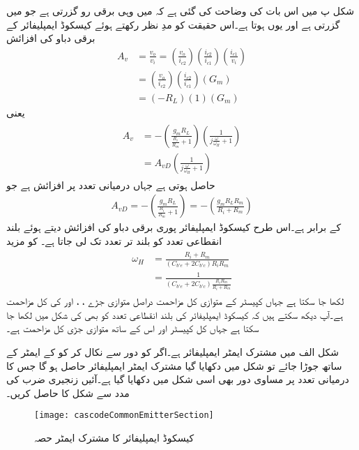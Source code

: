 شکل  پ میں اس بات کی وضاحت کی گئی ہے کہ  میں وہی برقی رو گزرتی ہے جو  میں گزرتی ہے اور یوں  ہوتا ہے۔اس حقیقت کو مدِ نظر رکھتے ہوئے کیسکوڈ ایمپلیفائر کے برقی دباو کی افزائش 
\begin{align*}
A_v&=\frac{v_o}{v_i}=\left( \frac{v_o}{i_{c2}} \right) \left(\frac{i_{c2}}{i_{c1}} \right) \left(\frac{i_{c1}}{v_i} \right)\\
&=\left( \frac{v_o}{i_{c2}} \right) \left(\frac{i_{c2}}{i_{c1}} \right) \left(G_m \right)\\
&=\left(-R_L \right) \left(1 \right) \left(G_m \right)
\end{align*}
یعنی
\begin{gather}
\begin{aligned}
A_v&=-\left(\frac{g_m R_L}{\frac{R_i}{R_m}+1} \right) \left(\frac{1}{j \frac{\omega}{\omega_H} +1}\right)\\
&=A_{vD} \left(\frac{1}{j \frac{\omega}{\omega_H} +1}\right)
\end{aligned}
\end{gather}
حاصل ہوتی ہے جہاں  درمیانی تعدد پر افزائش ہے جو
\begin{align}\label{مساوات_تعددی_ردعمل_کیسکوڈ_درمیانی_تعدد_کی_افزائش}
A_{vD}=-\left(\frac{g_m R_L}{\frac{R_i}{R_m}+1} \right) =-\left(\frac{g_m R_L R_m}{R_i+R_m}\right)
\end{align}
کے برابر ہے۔اس طرح کیسکوڈ ایمپلیفائر پوری برقی دباو کی افزائش دیتے ہوئے بلند انقطاعی تعدد کو بلند تر تعدد تک لی جاتا ہے۔ کو مزید
\begin{gather}
\begin{aligned}\label{مساوات_تعددی_ردعمل_کیسکوڈ_بلند_انقطاعی_تعدد}
\omega_H&= \frac{R_i+R_m}{\left( C_{b'e}+2 C_{b'c} \right)  R_i R_m}\\
&=\frac{1}{\left( C_{b'e}+2 C_{b'c} \right)  \frac{R_i R_m}{R_i+R_m}}
\end{aligned}
\end{gather}
لکھا جا سکتا ہے جہاں کپیسٹر  کے متوازی کل مزاحمت   دراصل متوازی جڑے ، ،  اور  کی کل مزاحمت ہے۔آپ دیکھ سکتے ہیں کہ کیسکوڈ ایمپلیفائر کی بلند انقطاعی تعدد کو بھی  کی شکل میں لکھا جا سکتا ہے جہاں  کل کپیسٹر اور  اس کے ساتھ متوازی جڑی کل مزاحمت ہے۔

شکل  الف میں مشترک ایمٹر ایمپلیفائر ہے۔اگر  کو دور سے نکال کر  کو  کے ایمٹر کے ساتھ جوڑا جائے تو شکل  میں دکھایا گیا مشترک ایمٹر ایمپلیفائر حاصل ہو گا جس کا درمیانی تعدد پر مساوی دور بھی اسی شکل میں دکھایا گیا ہے۔آئیں زنجیری ضرب کی مدد سے شکل  کا  حاصل کریں۔
\begin{figure}
\centering
\texttt{[image: cascodeCommonEmitterSection]}
\caption{کیسکوڈ ایمپلیفائر کا مشترک ایمٹر حصہ}
\label{شکل_تعددی_ردعمل_کیسکوڈ_ایمپلیفائر_مشترک_مخارج_حصہ}
\end{figure}

